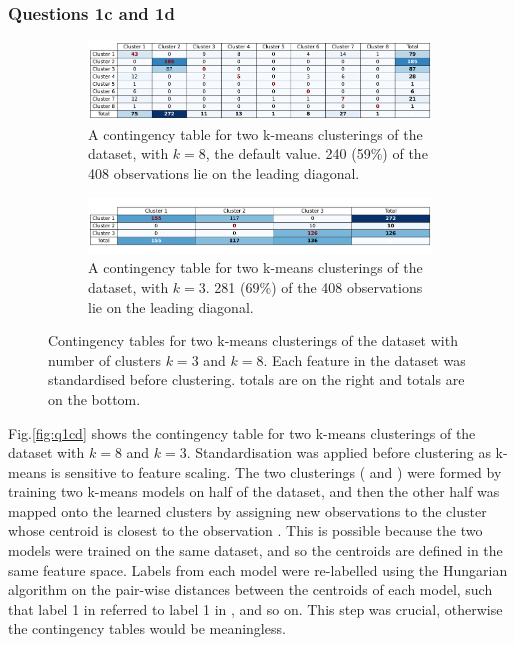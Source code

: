 \subsubsection{Questions 1c and 1d}\label{subsubsec:q1cd}
    \begin{figure}[htb]
    \centering
    \begin{subfigure}[b]{0.9\linewidth}
        \includegraphics[width=1\textwidth]{./figures/q1c}
        \caption{A contingency table for two k-means clusterings of the  dataset, with $k=8$,
            the default  value. 240 (59\%) of the 408 observations lie on the leading diagonal.}
        \label{fig:q1c}
    \end{subfigure}
    \hfill
    \begin{subfigure}[b]{0.9\linewidth}
        \includegraphics[width=1\textwidth]{./figures/q1d}
        \caption{A contingency table for two k-means clusterings of the  dataset, with $k=3$.
            281 (69\%) of the 408 observations lie on the leading diagonal.}
        \label{fig:q1d}
    \end{subfigure}
    \caption{Contingency tables for two k-means clusterings of the  dataset with number of
        clusters $k=3$ and $k=8$.
        Each feature in the dataset was standardised before clustering.
         totals are on the right and  totals are on the bottom.}
    \label{fig:q1cd}
    \end{figure}

    Fig.\eqref{fig:q1cd} shows the contingency table for two k-means clusterings of the dataset with $k=8$ and $k=3$.
    Standardisation was applied before clustering as k-means is sensitive to feature scaling.
    The two clusterings ( and ) were formed by training two k-means models on
    half of the dataset, and then the other half was mapped onto the learned clusters by assigning new observations
    to the cluster whose centroid is closest to the observation \cite{sklearn-k-means}.
    This is possible because the two models were trained on the same dataset, and so the centroids are defined in the same
    feature space.
    Labels from each model were re-labelled using the Hungarian algorithm \cite{scipy-linsumopt} \cite{assignment-problem} on
    the pair-wise distances between the centroids of each model, such that label 1 in  referred to
    label 1 in , and so on.
    This step was crucial, otherwise the contingency tables would be meaningless.

